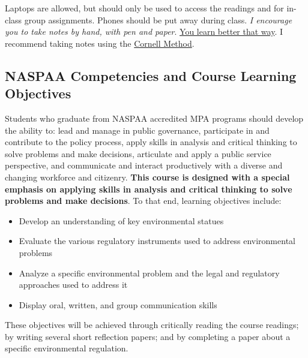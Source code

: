 \vspace{0.1in}

\noindent Laptops are allowed, but should only be used to access the
readings and for in-class group assignments. Phones should be put away
during class. \emph{I encourage you to take notes by hand, with pen and
paper}.
\href{https://www.nytimes.com/2017/11/27/learning/should-teachers-and-professors-ban-student-use-of-laptops-in-class.html}{You
learn better that way}. I recommend taking notes using the
\href{http://www.usu.edu/arc/idea_sheets/pdf/note_taking_cornell.pdf}{Cornell
Method}.

\hypertarget{naspaa-competencies-and-course-learning-objectives}{%
\subsection{NASPAA Competencies and Course Learning
Objectives}\label{naspaa-competencies-and-course-learning-objectives}}

Students who graduate from NASPAA accredited MPA programs should develop
the ability to: lead and manage in public governance, participate in and
contribute to the policy process, apply skills in analysis and critical
thinking to solve problems and make decisions, articulate and apply a
public service perspective, and communicate and interact productively
with a diverse and changing workforce and citizenry. \textbf{This course
is designed with a special emphasis on applying skills in analysis and
critical thinking to solve problems and make decisions}. To that end,
learning objectives include:

\begin{itemize}
\item
  Develop an understanding of key environmental statues
\item
  Evaluate the various regulatory instruments used to address
  environmental problems
\item
  Analyze a specific environmental problem and the legal and regulatory
  approaches used to address it
\item
  Display oral, written, and group communication skills
\end{itemize}

\vspace{0.10in}

\noindent These objectives will be achieved through critically reading
the course readings; by writing several short reflection papers; and by
completing a paper about a specific environmental regulation.

